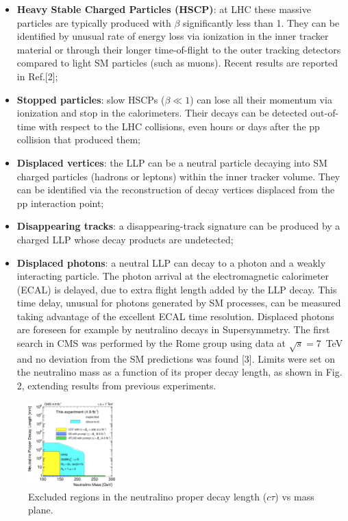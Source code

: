 \documentclass[twocolumn,twoside,10pt,nodate]{article}
\begin{document}
\begin{itemize}
\item {\bf Heavy Stable Charged Particles (HSCP)}: at LHC these massive 
particles are typically produced with $\beta$ significantly less than
1. They can be
identified by unusual rate of energy loss via ionization in the inner
tracker material or through their 
longer time-of-flight to the outer tracking detectors
compared to light SM particles (such as muons). 
Recent results are reported in Ref.[2];
\item {\bf Stopped particles}: slow HSCPs ($\beta \ll 1$) can lose all 
their momentum via ionization and stop in the calorimeters. 
  Their decays can be detected out-of-time with respect to the
  LHC collisions, even hours or days after the pp collision that produced
  them;
\item {\bf Displaced vertices}: the LLP can be a neutral particle
  decaying into SM charged particles (hadrons or leptons) within the
  inner tracker volume. They can be identified via the reconstruction
  of decay vertices displaced from the pp interaction point;
\item {\bf Disappearing tracks}: a disappearing-track signature can be produced by a
  charged LLP whose decay products are undetected;
\item {\bf Displaced photons}: a neutral LLP can decay to a photon and a weakly
  interacting particle. 
The photon arrival at
  the electromagnetic calorimeter (ECAL) is delayed, due to extra flight
  length added by the LLP decay. This time delay, unusual for photons
  generated by SM processes, can be measured taking advantage of the
  excellent ECAL time resolution. Displaced photons are foreseen for
  example by neutralino decays in Supersymmetry. 
The first search in CMS was performed by the Rome group using data at
$\sqrt{s}=7$~TeV and no deviation from the SM predictions was found [3].
Limits were set on the neutralino mass as a function of its proper
decay length, as shown in Fig. 2, extending results from previous experiments.
\end{itemize}

\begin{figure}[h]
\centering
\includegraphics[width=0.30\textwidth,angle=0]{santanastasio_fig2.png}
\caption{\small Excluded regions in the neutralino proper decay length
  ($c\tau$) vs mass plane.} %
\end{figure}
\end{document}

